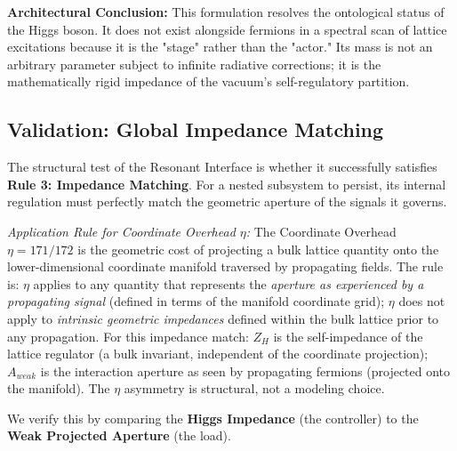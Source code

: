 \textbf{Architectural Conclusion:} This formulation resolves the ontological status of the Higgs boson. It does not exist alongside fermions in a spectral scan of lattice excitations because it is the "stage" rather than the "actor." Its mass is not an arbitrary parameter subject to infinite radiative corrections; it is the mathematically rigid impedance of the vacuum's self-regulatory partition.


\subsection{Validation: Global Impedance Matching}
The structural test of the Resonant Interface is whether it successfully satisfies \textbf{Rule 3: Impedance Matching}. For a nested subsystem to persist, its internal regulation must perfectly match the geometric aperture of the signals it governs.

\textit{Application Rule for Coordinate Overhead $\eta$:} The Coordinate Overhead $\eta = 171/172$ is the geometric cost of projecting a bulk lattice quantity onto the lower-dimensional coordinate manifold traversed by propagating fields. The rule is: $\eta$ applies to any quantity that represents the \emph{aperture as experienced by a propagating signal} (defined in terms of the manifold coordinate grid); $\eta$ does not apply to \emph{intrinsic geometric impedances} defined within the bulk lattice prior to any propagation. For this impedance match: $Z_H$ is the self-impedance of the lattice regulator (a bulk invariant, independent of the coordinate projection); $A_{weak}$ is the interaction aperture as seen by propagating fermions (projected onto the manifold). The $\eta$ asymmetry is structural, not a modeling choice.

We verify this by comparing the \textbf{Higgs Impedance} (the controller) to the \textbf{Weak Projected Aperture} (the load).

